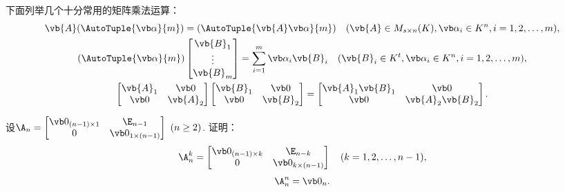\begin{remark}
下面列举几个十分常用的矩阵乘法运算：\begin{gather*}
	\vb{A} (\AutoTuple{\vb\alpha}{m})
	= (\AutoTuple{\vb{A} \vb\alpha}{m})
	\quad(\vb{A} \in M_{s \times n}(K),\vb\alpha_i \in K^n,i=1,2,\dotsc,m), \\
	(\AutoTuple{\vb\alpha}{m})
	\begin{bmatrix}
		\vb{B}_1 \\
		\vdots \\
		\vb{B}_m
	\end{bmatrix}
	= \sum_{i=1}^m \vb\alpha_i \vb{B}_i
	\quad(\vb{B}_i \in K^t,\vb\alpha_i \in K^n,i=1,2,\dotsc,m), \\
	\begin{bmatrix}
		\vb{A}_1 & \vb0 \\
		\vb0 & \vb{A}_2
	\end{bmatrix}
	\begin{bmatrix}
		\vb{B}_1 & \vb0 \\
		\vb0 & \vb{B}_2
	\end{bmatrix}
	= \begin{bmatrix}
		\vb{A}_1 \vb{B}_1 & \vb0 \\
		\vb0 & \vb{A}_2 \vb{B}_2
	\end{bmatrix}.
\end{gather*}
\end{remark}

\begin{example}
设\(\A_n = \begin{bmatrix}
	\vb0_{(n-1)\times1} & \E_{n-1} \\
	0 & \vb0_{1\times(n-1)}
\end{bmatrix}\ (n\geq2)\).
证明：\[
	\A_n^k = \begin{bmatrix}
		\vb0_{(n-1)\times k} & \E_{n-k} \\
		0 & \vb0_{k\times(n-1)}
	\end{bmatrix}
	\quad(k=1,2,\dotsc,n-1),
\]\[
	\A_n^n = \vb0_n.
\]
\end{example}
